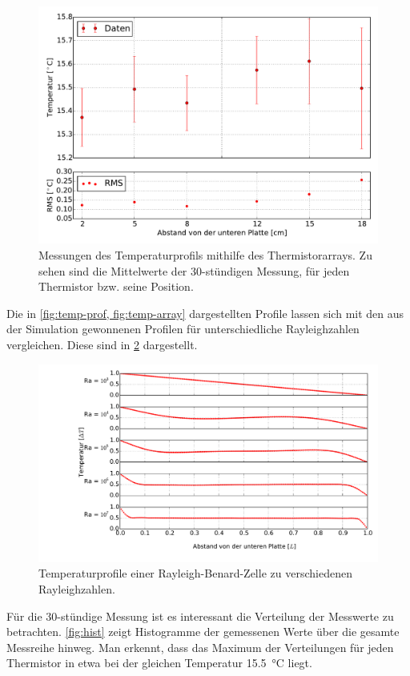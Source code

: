 \begin{figure}
	\centering
	\includegraphics[width=\textwidth]{plots/T_korr_profile.pdf}
	\caption{Messungen des Temperaturprofils mithilfe des Thermistorarrays. Zu sehen sind die Mittelwerte der 30-stündigen Messung, für jeden Thermistor bzw. seine Position.}\label{fig:temp-array}
\end{figure}
Die in \cref{fig:temp-prof, fig:temp-array} dargestellten Profile lassen sich mit den aus der Simulation gewonnenen Profilen für unterschiedliche Rayleighzahlen vergleichen.
Diese sind in \cref{fig:sim-temp} dargestellt.
\\
\begin{figure}
	\centering
	\includegraphics[width=\textwidth]{plots/T_sim_Profile.pdf}
	\caption{Temperaturprofile einer Rayleigh-Benard-Zelle zu verschiedenen Rayleighzahlen.}\label{fig:sim-temp}
\end{figure}
Für die 30-stündige Messung ist es interessant die Verteilung der Messwerte zu betrachten. \cref{fig:hist} zeigt Histogramme der gemessenen Werte über die gesamte Messreihe hinweg. Man erkennt, dass das Maximum der Verteilungen für jeden Thermistor in etwa bei der gleichen Temperatur \SI{15.5}{\celsius} liegt. 
